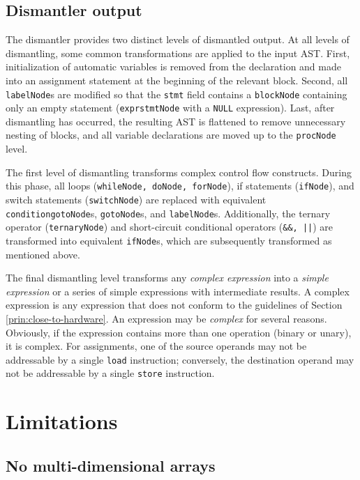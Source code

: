 \documentclass{article}
\begin{document}
\subsection{\label{output:output} Dismantler output}

The dismantler provides two distinct levels of dismantled output.  At
all levels of dismantling, some common transformations are applied to
the input AST.  First, initialization of automatic variables is
removed from the declaration and made into an assignment statement at
the beginning of the relevant block.  Second, all \texttt{labelNode}s
are modified so that the \texttt{stmt} field contains a
\texttt{blockNode} containing only an empty statement
(\texttt{exprstmtNode} with a \texttt{NULL} expression).  Last, after
dismantling has occurred, the resulting AST is flattened to remove
unnecessary nesting of blocks, and all variable declarations are moved
up to the
\texttt{procNode} level.

The first level of dismantling transforms complex control flow
constructs.  During this phase, all loops (\texttt{whileNode, doNode,
forNode}), if statements (\texttt{ifNode}), and switch statements
(\texttt{switchNode}) are replaced with equivalent
\texttt{conditiongotoNode}s, \texttt{gotoNode}s, and
\texttt{labelNode}s.  Additionally, the ternary operator
(\texttt{ternaryNode}) and short-circuit conditional operators
(\texttt{\&\&, ||}) are transformed into equivalent \texttt{ifNode}s,
which are subsequently transformed as mentioned above.

The final dismantling level transforms any \emph{complex expression}
into a \emph{simple expression} or a series of simple expressions with
intermediate results.  A complex expression is any expression that
does not conform to the guidelines of Section
\ref{prin:close-to-hardware}.  An expression may be \emph{complex} for
several reasons.  Obviously, if the expression contains more than one
operation (binary or unary), it is complex.  For assignments, one of
the source operands may not be addressable by a single \texttt{load}
instruction; conversely, the destination operand may not be
addressable by a single \texttt{store} instruction.

\section{\label{limit} Limitations}

\subsection{No multi-dimensional arrays}
\end{document}

